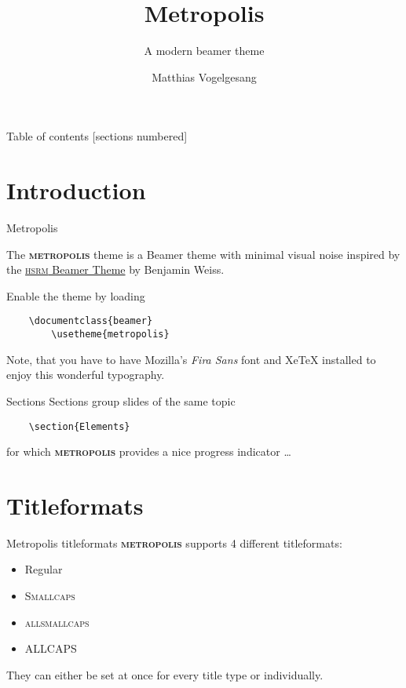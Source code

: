 \documentclass[10pt]{beamer}
\title{Metropolis}
\subtitle{A modern beamer theme}
\date{}
\author{Matthias Vogelgesang}
\institute{Center for modern beamer themes}
\newcommand{\themename}{\textbf{\textsc{metropolis}}\xspace}
\begin{document}
    
    \maketitle
    
    \begin{frame}{Table of contents}
      [sections numbered]
      \tableofcontents[hideallsubsections]
    \end{frame}
    
    \section{Introduction}
    
    \begin{frame}[fragile]{Metropolis}
    
      The \themename theme is a Beamer theme with minimal visual noise
      inspired by the \href{https://github.com/hsrmbeamertheme/hsrmbeamertheme}{\textsc{hsrm} Beamer
      Theme} by Benjamin Weiss.
    
      Enable the theme by loading
    
      \begin{verbatim}    \documentclass{beamer}
        \usetheme{metropolis}\end{verbatim}
    
      Note, that you have to have Mozilla's \emph{Fira Sans} font and XeTeX
      installed to enjoy this wonderful typography.
    \end{frame}
    \begin{frame}[fragile]{Sections}
      Sections group slides of the same topic
    
      \begin{verbatim}    \section{Elements}\end{verbatim}
    
      for which \themename provides a nice progress indicator \ldots
    \end{frame}
    
    \section{Titleformats}
    
    \begin{frame}{Metropolis titleformats}
        \themename supports 4 different titleformats:
        \begin{itemize}
            \item Regular
            \item \textsc{Smallcaps}
            \item \textsc{allsmallcaps}
            \item ALLCAPS
        \end{itemize}
        They can either be set at once for every title type or individually.
    \end{frame}
    
\end{document}
